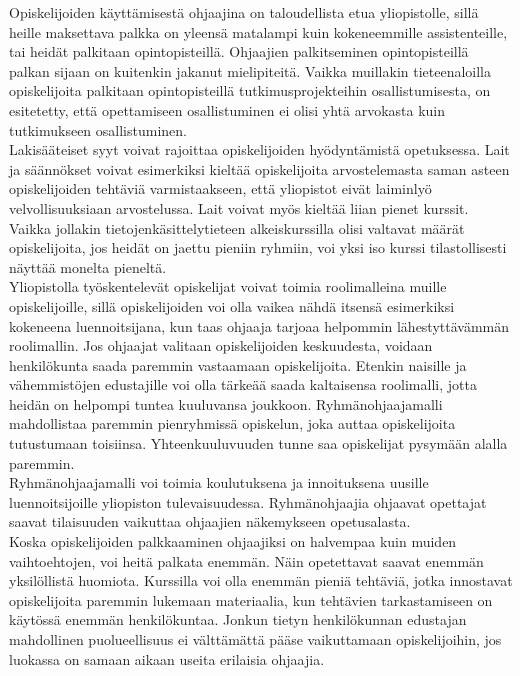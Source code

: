 \documentclass[finnish]{tktltiki2}
\theoremstyle{definition}
\theoremstyle{remark}
\begin{document}
Opiskelijoiden käyttämisestä ohjaajina on taloudellista etua yliopistolle, sillä heille maksettava palkka on yleensä matalampi kuin kokeneemmille assistenteille, tai heidät palkitaan opintopisteillä. Ohjaajien palkitseminen opintopisteillä palkan sijaan on kuitenkin jakanut mielipiteitä. Vaikka muillakin tieteenaloilla opiskelijoita palkitaan opintopisteillä tutkimusprojekteihin osallistumisesta, on esitetetty, että opettamiseen osallistuminen ei olisi yhtä arvokasta kuin tutkimukseen osallistuminen.\cite{Reges88}
\\
Lakisääteiset syyt voivat rajoittaa opiskelijoiden hyödyntämistä opetuksessa. Lait ja säännökset voivat esimerkiksi kieltää opiskelijoita arvostelemasta saman asteen opiskelijoiden tehtäviä varmistaakseen, että yliopistot eivät laiminlyö velvollisuuksiaan arvostelussa. Lait voivat myös kieltää liian pienet kurssit. Vaikka jollakin tietojenkäsittelytieteen alkeiskurssilla olisi valtavat määrät opiskelijoita, jos heidät on jaettu pieniin ryhmiin, voi yksi iso kurssi tilastollisesti näyttää monelta pieneltä.\cite{Reges03}
\\
Yliopistolla työskentelevät opiskelijat voivat toimia roolimalleina muille opiskelijoille\cite{Roberts95, Tashakkori05}, sillä opiskelijoiden voi olla vaikea nähdä itsensä esimerkiksi kokeneena luennoitsijana, kun taas ohjaaja tarjoaa helpommin lähestyttävämmän roolimallin.\cite{Roberts02} Jos ohjaajat valitaan opiskelijoiden keskuudesta, voidaan henkilökunta saada paremmin vastaamaan opiskelijoita. Etenkin naisille ja vähemmistöjen edustajille voi olla tärkeää saada kaltaisensa roolimalli, jotta heidän on helpompi tuntea kuuluvansa joukkoon.\cite{Morgan02} Ryhmänohjaajamalli mahdollistaa paremmin pienryhmissä opiskelun, joka auttaa opiskelijoita tutustumaan toisiinsa. Yhteenkuuluvuuden tunne saa opiskelijat pysymään alalla paremmin.
\\
Ryhmänohjaajamalli voi toimia koulutuksena ja innoituksena uusille luennoitsijoille yliopiston tulevaisuudessa.\cite{Roberts95, Morgan02} Ryhmänohjaajia ohjaavat opettajat saavat tilaisuuden vaikuttaa ohjaajien näkemykseen opetusalasta.\cite{Morgan02}
\\
Koska opiskelijoiden palkkaaminen ohjaajiksi on halvempaa kuin muiden vaihtoehtojen, voi heitä palkata enemmän. Näin opetettavat saavat enemmän yksilöllistä huomiota. Kurssilla voi olla enemmän pieniä tehtäviä, jotka innostavat opiskelijoita paremmin lukemaan materiaalia, kun tehtävien tarkastamiseen on käytössä enemmän henkilökuntaa.\cite{Dickson11} Jonkun tietyn henkilökunnan edustajan mahdollinen puolueellisuus ei välttämättä pääse vaikuttamaan opiskelijoihin, jos luokassa on samaan aikaan useita erilaisia ohjaajia.\cite{Morgan02}
\end{document}
